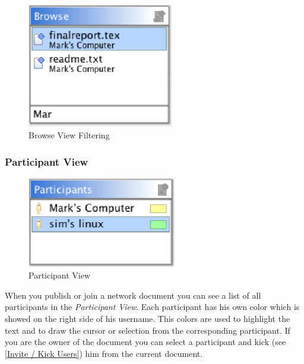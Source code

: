 \documentclass[11pt,a4paper]{article}
\begin{document}
\begin{figure}[H]
\begin{center}
  \includegraphics[height=2.14in, width=2.51in]{../images/usermanual/bview_filtering.eps}
\caption{Browse View Filtering}
\label{default}
\end{center}
\end{figure}

\subsubsection{Participant View}

\begin{figure}[H]
\begin{center}
  \includegraphics[height=1.56in, width=2.56in]{../images/usermanual/pview_overview.eps}
\caption{Participant View}
\label{default}
\end{center}
\end{figure}

When you publish or join a network document you can see a list of all participants in the \textit{Participant View}. Each participant has his own color which is showed on the right side of his username. This colors are used to highlight the text and to draw the cursor or selection from the corresponding participant. If you are the owner of the document you can select a participant and kick (see \ref{Invite / Kick Users}) him from the current document.

\end{document}
